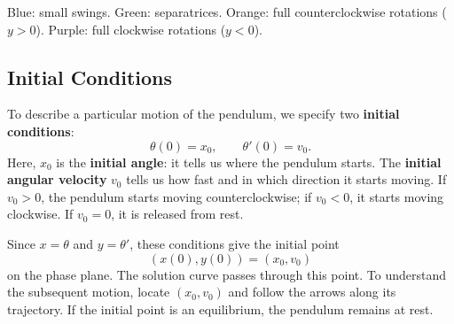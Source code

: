 \documentclass[11pt,letterpaper]{article}
\begin{document}
\begin{center}

\small
Blue: small swings.
Green: separatrices.
Orange: full counterclockwise rotations ($y>0$).
Purple: full clockwise rotations ($y<0$).
\end{center}


\subsection{Initial Conditions}

To describe a particular motion of the pendulum, we specify
two \textbf{initial conditions}:
\[
\theta(0)=x_0,\qquad \theta'(0)=v_0.
\]
Here, $x_0$ is the \textbf{initial angle}: it tells us where
the pendulum starts. The \textbf{initial angular velocity}
$v_0$ tells us how fast and in which direction it starts
moving. If $v_0>0$, the pendulum starts moving
counterclockwise; if $v_0<0$, it starts moving clockwise.
If $v_0=0$, it is released from rest.

Since $x=\theta$ and $y=\theta'$, these conditions give
the initial point
\[
\boxed{(x(0),y(0))=(x_0,v_0)}
\]
on the phase plane. The solution curve passes through
this point. To understand the subsequent motion, locate
$(x_0,v_0)$ and follow the arrows along its trajectory.
If the initial point is an equilibrium, the pendulum
remains at rest.
\end{document}
